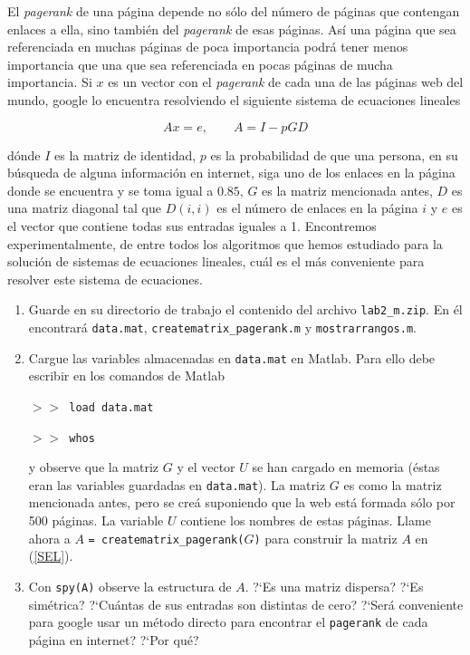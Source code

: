 \documentclass[12pt,letterpaper]{article}
\begin{document}
\begin{enumerate}
El \textit{pagerank} de una p\'agina depende no s\'olo del n\'umero de p\'aginas que contengan enlaces a ella, sino tambi\'en del
\textit{pagerank} de esas p\'aginas. As\'i una p\'agina que sea referenciada en muchas p\'aginas de poca importancia podr\'a tener menos
importancia que una que sea referenciada en pocas p\'aginas de mucha importancia. Si $x$ es un vector con el \textit{pagerank} de cada una
de las p\'aginas web del mundo, google lo encuentra resolviendo el siguiente sistema de ecuaciones lineales

\begin{equation}\label{SEL}
  Ax=e, \qquad A=I-pGD
\end{equation}

d\'onde $I$ es la matriz de identidad, $p$ es la probabilidad de que una persona, en su b\'usqueda de alguna informaci\'on en internet,
siga uno de los enlaces en la p\'agina donde se encuentra y se toma igual a $0.85$, $G$ es la matriz mencionada antes, $D$ es una matriz
diagonal tal que $D(i,i)$ es el n\'umero de enlaces en la p\'agina $i$ y $e$ es el vector que contiene todas sus entradas iguales a
1. Encontremos experimentalmente, de entre todos los algoritmos que hemos estudiado para la soluci\'on de sistemas de ecuaciones lineales,
cu\'al es el m\'as conveniente para resolver este sistema de ecuaciones.
\begin{enumerate}
  \item Guarde en su directorio de trabajo el contenido del archivo \texttt{lab2\_m.zip}. En \'el encontrar\'a \texttt{data.mat},
\texttt{creatematrix\_pagerank.m} y \texttt{mostrarrangos.m}.
\item Cargue las variables almacenadas en \texttt{data.mat} en Matlab. Para ello debe escribir en los comandos de Matlab

\texttt{$>>$ load data.mat}

\texttt{$>>$ whos}

y observe que la matriz $G$ y el vector $U$ se han cargado en memoria (\'estas eran las variables guardadas en \texttt{data.mat}).
La matriz $G$ es como la matriz mencionada antes, pero se cre\'a suponiendo que la web est\'a formada s\'olo por 500 p\'aginas. La variable
$U$ contiene los nombres de estas p\'aginas. Llame ahora a $A$ \texttt{= creatematrix\_pagerank(}$G$\texttt{)} para construir la matriz $A$
en (\ref{SEL}).

\item Con \texttt{spy(A)} observe la estructura de $A$. ?`Es una matriz dispersa? ?`Es sim\'etrica? ?`Cu\'antas de sus entradas son
distintas de cero? ?`Ser\'a conveniente para google usar un m\'etodo directo para encontrar el \texttt{pagerank} de cada p\'agina en
internet? ?`Por qu\'e?


\end{enumerate}
\end{enumerate}
\end{document}
